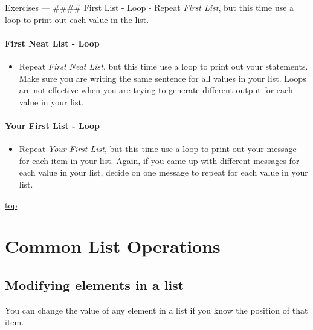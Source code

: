 \documentclass[11pt]{article}
\providecommand{\tightlist}{%
      \setlength{\itemsep}{0pt}\setlength{\parskip}{0pt}}
\begin{document}
    Exercises --- \#\#\#\# First List - Loop - Repeat \emph{First List}, but
this time use a loop to print out each value in the list.

\hypertarget{first-neat-list---loop}{%
\paragraph{First Neat List - Loop}\label{first-neat-list---loop}}

\begin{itemize}
\tightlist
\item
  Repeat \emph{First Neat List}, but this time use a loop to print out
  your statements. Make sure you are writing the same sentence for all
  values in your list. Loops are not effective when you are trying to
  generate different output for each value in your list.
\end{itemize}

\hypertarget{your-first-list---loop}{%
\paragraph{Your First List - Loop}\label{your-first-list---loop}}

\begin{itemize}
\tightlist
\item
  Repeat \emph{Your First List}, but this time use a loop to print out
  your message for each item in your list. Again, if you came up with
  different messages for each value in your list, decide on one message
  to repeat for each value in your list.
\end{itemize}

    \protect\hyperlink{}{top}

    \hypertarget{common-list-operations}{%
\section{Common List Operations}\label{common-list-operations}}

    \hypertarget{modifying-elements-in-a-list}{%
\subsection{Modifying elements in a
list}\label{modifying-elements-in-a-list}}

You can change the value of any element in a list if you know the
position of that item.
\end{document}
